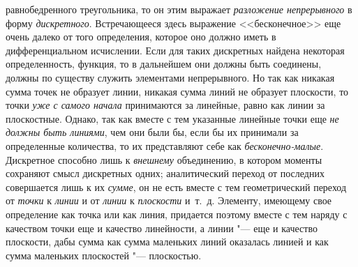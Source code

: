 равнобедренного треугольника, то он этим выражает {\em разложение непрерывного}
в форму {\em дискретного}. Встречающееся здесь выражение <<бесконечное>> еще
очень далеко от того определения, которое оно должно иметь в дифференциальном
исчислении. Если для таких дискретных найдена некоторая определенность,
функция, то в дальнейшем они должны быть соединены, должны по существу служить
элементами непрерывного. Но так как никакая сумма точек не образует линии,
никакая сумма линий не образует плоскости, то точки {\em уже с самого начала}
принимаются за линейные, равно как линии за плоскостные. Однако, так как вместе
с тем указанные линейные точки еще {\em не должны быть линиями}, чем они были
бы, если бы их принимали за определенные количества, то их представляют себе
как {\em бесконечно-малые}. Дискретное способно лишь к {\em внешнему}
объединению, в котором моменты сохраняют смысл дискретных одних; аналитический
переход от последних совершается лишь к их {\em сумме}, он не есть вместе с тем
геометрический переход от {\em точки} к {\em линии} и от {\em линии} к
{\em плоскости} и~т.~д. Элементу, имеющему свое определение как точка или как
линия, придается поэтому вместе с тем наряду с качеством точки еще и качество
линейности, а линии "--- еще и качество плоскости, дабы сумма как сумма
маленьких линий оказалась линией и как сумма маленьких плоскостей "---
плоскостью.

